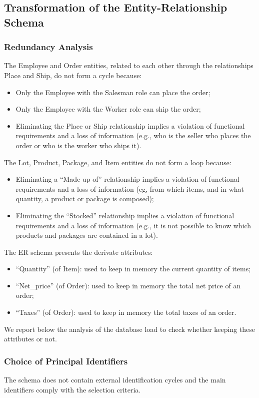 \subsection{Transformation of the Entity-Relationship Schema}
\subsubsection{Redundancy Analysis}
The Employee and Order entities, related to each other through the relationships Place and Ship, do not form a cycle because:
\begin{itemize}
        \item Only the Employee with the Salesman role can place the order;
        \item Only the Employee with the Worker role can ship the order;
        \item Eliminating the Place or Ship relationship implies a violation of functional requirements and a loss of information (e.g., who is the seller who places the order or who is the worker who ships it).
\end{itemize}
The Lot, Product, Package, and Item entities do not form a loop because:
\begin{itemize}
        \item Eliminating a ``Made up of'' relationship implies a violation of functional requirements and a loss of information (eg, from which items, and in what quantity, a product or package is composed);
        \item Eliminating the ``Stocked'' relationship implies a violation of functional requirements and a loss of information (e.g., it is not possible to know which products and packages are contained in a lot).
\end{itemize}
The ER schema presents the derivate attributes:
\begin{itemize}
        \item ``Quantity'' (of Item): used to keep in memory the current quantity of items;
        \item ``Net\_price'' (of Order): used to keep in memory the total net price of an order;
        \item ``Taxes'' (of Order): used to keep in memory the total taxes of an order.
\end{itemize}
\vspace{0.25em}
We report below the analysis of the database load to check whether keeping these attributes or not.
\subsubsection{Choice of Principal Identifiers}
The schema does not contain external identification cycles and the main identifiers comply with the selection criteria.